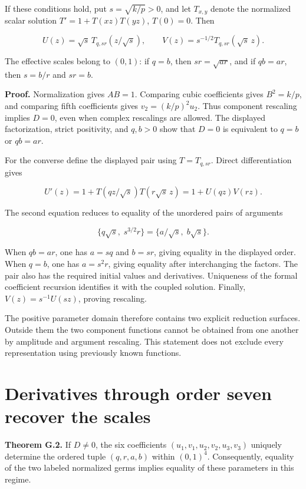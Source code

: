 If these conditions hold, put \(s=\sqrt{k/p}>0\), and let \(T_{x,y}\)
denote the normalized scalar solution \(T'=1+T(xz)T(yz)\), \(T(0)=0\).
Then

\[
\boxed{
U(z)=\sqrt{s}\,T_{q,sr}(z/\sqrt{s}),\qquad
V(z)=s^{-1/2}T_{q,sr}(\sqrt{s}\,z).
}
\]

The effective scales belong to \((0,1)\): if \(q=b\), then
\(sr=\sqrt{ar}\), and if \(qb=ar\), then \(s=b/r\) and \(sr=b\).

\textbf{Proof.} Normalization gives \(AB=1\). Comparing cubic
coefficients gives \(B^2=k/p\), and comparing fifth coefficients gives
\(v_2=(k/p)^2u_2\). Thus component rescaling implies \(D=0\), even when
complex rescalings are allowed. The displayed factorization, strict
positivity, and \(q,b>0\) show that \(D=0\) is equivalent to \(q=b\) or
\(qb=ar\).

For the converse define the displayed pair using \(T=T_{q,sr}\). Direct
differentiation gives

\[
U'(z)=1+T(qz/\sqrt{s})T(r\sqrt{s}\,z)
=1+U(qz)V(rz).
\]

The second equation reduces to equality of the unordered pairs of
arguments

\[
\{q\sqrt{s},\;s^{3/2}r\}
=\{a/\sqrt{s},\;b\sqrt{s}\}.
\]

When \(qb=ar\), one has \(a=sq\) and \(b=sr\), giving equality in the
displayed order. When \(q=b\), one has \(a=s^2r\), giving equality after
interchanging the factors. The pair also has the required initial values
and derivatives. Uniqueness of the formal coefficient recursion
identifies it with the coupled solution. Finally, \(V(z)=s^{-1}U(sz)\),
proving rescaling.

The positive parameter domain therefore contains two explicit reduction
surfaces. Outside them the two component functions cannot be obtained
from one another by amplitude and argument rescaling. This statement
does not exclude every representation using previously known functions.

\hypertarget{v11-coupled_inverse_full-seven-derivatives-recover-all-four-ordered-scales-away-from-reduction}{%
\section{Derivatives through order seven recover the scales}\label{v11-coupled_inverse_full-seven-derivatives-recover-all-four-ordered-scales-away-from-reduction}}

\textbf{Theorem G.2.} If \(D\ne0\), the six coefficients
\((u_1,v_1,u_2,v_2,u_3,v_3)\) uniquely determine the ordered tuple
\((q,r,a,b)\) within \((0,1)^4\). Consequently, equality of the two
labeled normalized germs implies equality of these parameters in this
regime.

